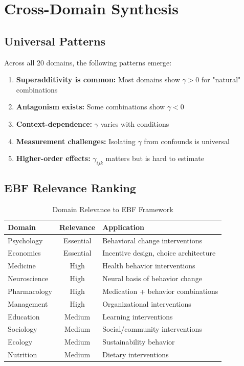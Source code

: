 \section{Cross-Domain Synthesis}
\label{sec:synthesis}

\subsection{Universal Patterns}

\begin{theorem}
Across all 20 domains, the following patterns emerge:
\begin{enumerate}
    \item \textbf{Superadditivity is common:} Most domains show $\gamma > 0$ for "natural" combinations
    \item \textbf{Antagonism exists:} Some combinations show $\gamma < 0$
    \item \textbf{Context-dependence:} $\gamma$ varies with conditions
    \item \textbf{Measurement challenges:} Isolating $\gamma$ from confounds is universal
    \item \textbf{Higher-order effects:} $\gamma_{ijk}$ matters but is hard to estimate
\end{enumerate}
\end{theorem}

\subsection{EBF Relevance Ranking}

\begin{table}[h]
\centering
\caption{Domain Relevance to EBF Framework}
\label{tab:ebf-relevance}
\renewcommand{\arraystretch}{1.3}
\begin{tabular}{@{}lcp{6cm}@{}}
\toprule
\textbf{Domain} & \textbf{Relevance} & \textbf{Application} \\
\midrule
Psychology & Essential & Behavioral change interventions \\
Economics & Essential & Incentive design, choice architecture \\
Medicine & High & Health behavior interventions \\
Neuroscience & High & Neural basis of behavior change \\
Pharmacology & High & Medication + behavior combinations \\
Management & High & Organizational interventions \\
Education & Medium & Learning interventions \\
Sociology & Medium & Social/community interventions \\
Ecology & Medium & Sustainability behavior \\
Nutrition & Medium & Dietary interventions \\
\bottomrule
\end{tabular}
\end{table}

